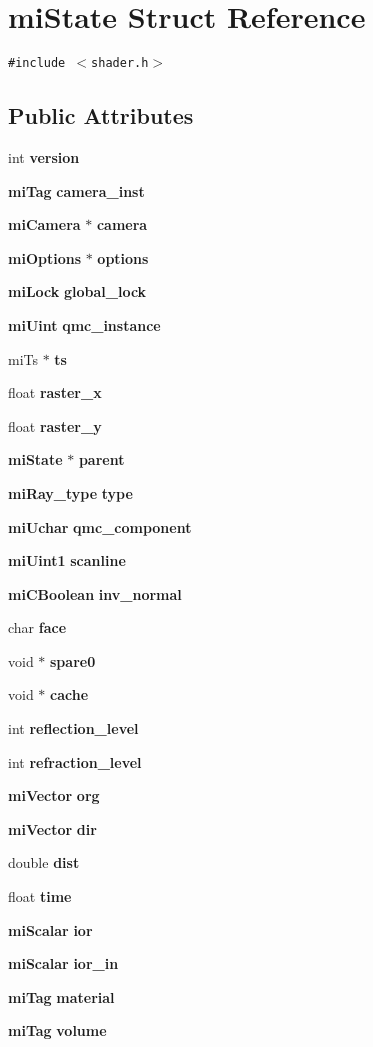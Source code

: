 \section{mi\-State Struct Reference}
\label{structmiState}
{\tt \#include $<$shader.h$>$}

\subsection*{Public Attributes}
\begin{CompactItemize}
\item 
int {\bf version}
\item 
{\bf mi\-Tag} {\bf camera\_\-inst}
\item 
{\bf mi\-Camera} $\ast$ {\bf camera}
\item 
{\bf mi\-Options} $\ast$ {\bf options}
\item 
{\bf mi\-Lock} {\bf global\_\-lock}
\item 
{\bf mi\-Uint} {\bf qmc\_\-instance}
\item 
mi\-Ts $\ast$ {\bf ts}
\item 
float {\bf raster\_\-x}
\item 
float {\bf raster\_\-y}
\item 
{\bf mi\-State} $\ast$ {\bf parent}
\item 
{\bf mi\-Ray\_\-type} {\bf type}
\item 
{\bf mi\-Uchar} {\bf qmc\_\-component}
\item 
{\bf mi\-Uint1} {\bf scanline}
\item 
{\bf mi\-CBoolean} {\bf inv\_\-normal}
\item 
char {\bf face}
\item 
void $\ast$ {\bf spare0}
\item 
void $\ast$ {\bf cache}
\item 
int {\bf reflection\_\-level}
\item 
int {\bf refraction\_\-level}
\item 
{\bf mi\-Vector} {\bf org}
\item 
{\bf mi\-Vector} {\bf dir}
\item 
double {\bf dist}
\item 
float {\bf time}
\item 
{\bf mi\-Scalar} {\bf ior}
\item 
{\bf mi\-Scalar} {\bf ior\_\-in}
\item 
{\bf mi\-Tag} {\bf material}
\item 
{\bf mi\-Tag} {\bf volume}

\end{CompactItemize}
